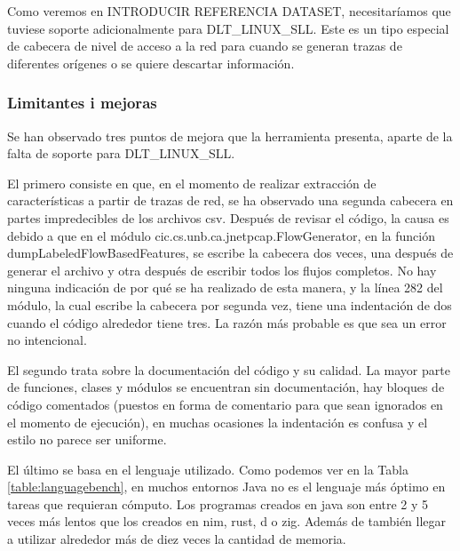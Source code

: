 Como veremos en INTRODUCIR REFERENCIA DATASET, necesitaríamos que tuviese soporte adicionalmente para DLT\_LINUX\_SLL. Este es un tipo especial de cabecera de nivel de acceso a la red para cuando se generan trazas de diferentes orígenes o se quiere descartar información.

\subsubsection{Limitantes i mejoras}

Se han observado tres puntos de mejora que la herramienta presenta, aparte de la falta de soporte para DLT\_LINUX\_SLL.

El primero consiste en que, en el momento de realizar extracción de características a partir de trazas de red, se ha observado una segunda cabecera en partes impredecibles de los archivos csv. Después de revisar el código, la causa es debido a que en el módulo cic.cs.unb.ca.jnetpcap.FlowGenerator, en la función dumpLabeledFlowBasedFeatures, se escribe la cabecera dos veces, una después de generar el archivo y otra después de escribir todos los flujos completos. No hay ninguna indicación de por qué se ha realizado de esta manera, y la línea 282 del módulo, la cual escribe la cabecera por segunda vez, tiene una indentación de dos cuando el código alrededor tiene tres. La razón más probable es que sea un error no intencional.

El segundo trata sobre la documentación del código y su calidad. La mayor parte de funciones, clases y módulos se encuentran sin documentación, hay bloques de código comentados (puestos en forma de comentario para que sean ignorados en el momento de ejecución), en muchas ocasiones la indentación es confusa y el estilo no parece ser uniforme. 

El último se basa en el lenguaje utilizado. Como podemos ver en la Tabla \ref{table:languagebench}, en muchos entornos Java no es el lenguaje más óptimo en tareas que requieran cómputo. Los programas creados en java son entre 2 y 5 veces más lentos que los creados en nim, rust, d o zig. Además de también llegar a utilizar alrededor más de diez veces la cantidad de memoria.


